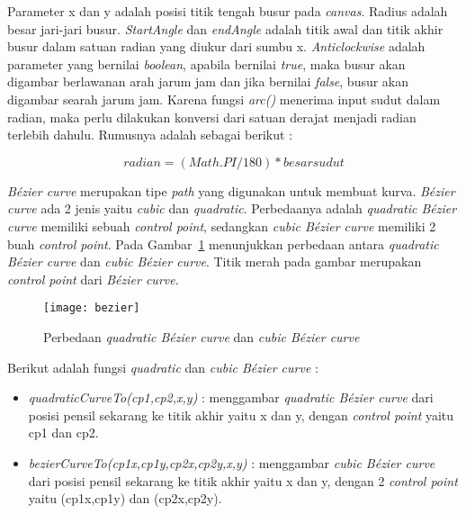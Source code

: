 Parameter x dan y adalah posisi titik tengah busur pada \textit{canvas}. Radius adalah besar jari-jari busur. \textit{StartAngle} dan \textit{endAngle} adalah titik awal dan titik akhir busur dalam satuan radian yang diukur dari sumbu x. \textit{Anticlockwise} adalah parameter yang bernilai \textit{boolean}, apabila bernilai \textit{true}, maka busur akan digambar berlawanan arah jarum jam dan jika bernilai \textit{false}, busur akan digambar searah jarum jam. Karena fungsi \textit{arc()} menerima input sudut dalam radian, maka perlu dilakukan konversi dari satuan derajat menjadi radian terlebih dahulu. Rumusnya adalah sebagai berikut :

\begin{displaymath}
	radian = (Math.PI / 180) * besar sudut
\end{displaymath}	

\textit{B\'ezier curve} merupakan tipe \textit{path} yang digunakan untuk membuat kurva. \textit{B\'ezier curve} ada 2 jenis yaitu \textit{cubic} dan \textit{quadratic}. Perbedaanya adalah \textit{quadratic B\'ezier curve} memiliki sebuah \textit{control point}, sedangkan \textit{cubic B\'ezier curve} memiliki 2 buah \textit{control point}. Pada Gambar~\ref{fig:bezier} menunjukkan perbedaan antara \textit{quadratic B\'ezier curve} dan \textit{cubic B\'ezier curve}. Titik merah pada gambar merupakan \textit{control point} dari \textit{B\'ezier curve}.

\begin{figure}[H]
	\centering  
	\texttt{[image: bezier]}
	\caption[Perbedaan \textit{quadratic B\'ezier curve} dan \textit{cubic B\'ezier curve}]{Perbedaan \textit{quadratic B\'ezier curve} dan \textit{cubic B\'ezier curve}\cite{MDN:05:Web}}
	\label{fig:bezier} 
\end{figure} 

Berikut adalah fungsi \textit{quadratic} dan \textit{cubic B\'ezier curve} :
\begin{itemize}
	\item \textit{quadraticCurveTo(cp1,cp2,x,y)} : menggambar \textit{quadratic B\'ezier curve} dari posisi pensil sekarang ke titik akhir yaitu x dan y, dengan \textit{control point} yaitu cp1 dan cp2.
	\item \textit{bezierCurveTo(cp1x,cp1y,cp2x,cp2y,x,y)} : menggambar \textit{cubic B\'ezier curve} dari posisi pensil sekarang ke titik akhir yaitu x dan y, dengan 2  \textit{control point} yaitu (cp1x,cp1y) dan (cp2x,cp2y).
\end{itemize}


